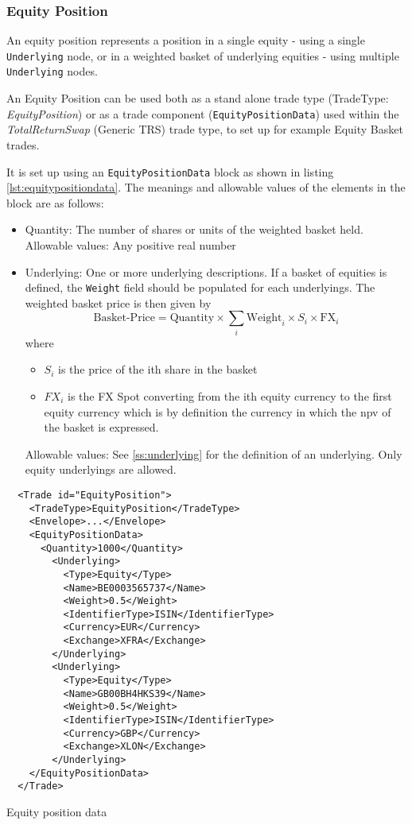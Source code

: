 \subsubsection{Equity Position}
\label{ss:equity_position}

An equity position represents a position in a single equity - using a single \lstinline!Underlying! node, or in a weighted basket of underlying equities -  using multiple \lstinline!Underlying! nodes. 

An Equity Position can be used both as a stand alone trade type (TradeType: \emph{EquityPosition}) or as a trade component ({\tt EquityPositionData}) used within the \emph{TotalReturnSwap} (Generic TRS) trade type, to set up for example Equity Basket trades.

 It is set up using an {\tt EquityPositionData} block as shown in listing \ref{lst:equitypositiondata}. The meanings and allowable
values of the elements in the block are as follows:

\begin{itemize}
\item Quantity: The number of shares or units of the weighted basket held.\\
  Allowable values: Any positive real number
\item Underlying: One or more underlying descriptions. If a basket of equities is defined, the \verb+Weight+ field
  should be populated for each underlyings. The weighted basket price is then given by\\
  $$\text{Basket-Price} = \text{Quantity} \times \sum_i \text{Weight}_i \times S_i \times \text{FX}_i$$
  where
  \begin{itemize}
  \item $S_i$ is the price of the ith share in the basket
  \item $FX_i$ is the FX Spot converting from the ith equity currency to the first equity currency which is by
    definition the currency in which the npv of the basket is expressed.
  \end{itemize}
  Allowable values: See \ref{ss:underlying} for the definition of an underlying. Only equity underlyings are allowed.
\end{itemize}

\begin{listing}[H]
\begin{verbatim}
  <Trade id="EquityPosition">
    <TradeType>EquityPosition</TradeType>
    <Envelope>...</Envelope>
    <EquityPositionData>
      <Quantity>1000</Quantity>
        <Underlying>
          <Type>Equity</Type>
          <Name>BE0003565737</Name>
          <Weight>0.5</Weight>
          <IdentifierType>ISIN</IdentifierType>
          <Currency>EUR</Currency>
          <Exchange>XFRA</Exchange>
        </Underlying>
        <Underlying>
          <Type>Equity</Type>
          <Name>GB00BH4HKS39</Name>
          <Weight>0.5</Weight>
          <IdentifierType>ISIN</IdentifierType>
          <Currency>GBP</Currency>
          <Exchange>XLON</Exchange>
        </Underlying>
    </EquityPositionData>
  </Trade>
\end{verbatim}
\caption{Equity position data}
\label{lst:equitypositiondata}
\end{listing}